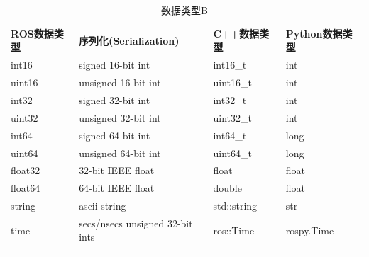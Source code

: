 \documentclass[geye,green,kindle,cn]{elegantnote}
\begin{document}
\begin{table}[htbp]
\centering
\begin{tabular}{p{35pt}<{\centering}|p{55pt}<{\centering}|p{40pt}<{\centering}|p{40pt}<{\centering}} 
\Xhline{1.0pt}
\textbf{\small{ROS数据类型}} &
\textbf{\small{序列化(Serialization)}} &
\textbf{\small{C++数据类型}} &
\textbf{\small{Python数据类型}} \\
\Xhline{1.0pt}
\scriptsize{int16} &
\scriptsize{signed 16-bit int} &
\scriptsize{int16\_t} &
\scriptsize{int} \\
\scriptsize{uint16} &
\scriptsize{unsigned 16-bit int} &
\scriptsize{uint16\_t} &
\scriptsize{int} \\
\hline
\scriptsize{int32} &
\scriptsize{signed 32-bit int} &
\scriptsize{int32\_t} &
\scriptsize{int} \\
\hline
\scriptsize{uint32} &
\scriptsize{unsigned 32-bit int} &
\scriptsize{uint32\_t} &
\scriptsize{int} \\
\hline
\scriptsize{int64} &
\scriptsize{signed 64-bit int} &
\scriptsize{int64\_t} &
\scriptsize{long} \\
\hline
\scriptsize{uint64} &
\scriptsize{unsigned 64-bit int} &
\scriptsize{uint64\_t} &
\scriptsize{long} \\
\hline
\scriptsize{float32} &
\scriptsize{32-bit IEEE float} &
\scriptsize{float} &
\scriptsize{float} \\
\hline
\scriptsize{float64} &
\scriptsize{64-bit IEEE float} &
\scriptsize{double} &
\scriptsize{float} \\
\hline
\scriptsize{string} &
\scriptsize{ascii string} &
\scriptsize{std::string} &
\scriptsize{str} \\
\hline
\scriptsize{time} &
\scriptsize{secs/nsecs unsigned 32-bit ints} &
\scriptsize{ros::Time} &
\scriptsize{rospy.Time} \\
\Xhline{1.0pt}
\end{tabular}
\centering
\caption{数据类型B} \label{table:DatatypeB}
\end{table}
\end{document}
